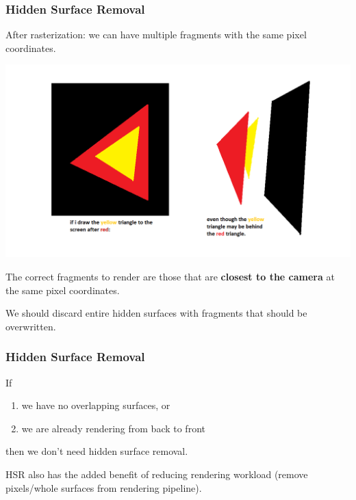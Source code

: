 \documentclass{beamer}
\begin{document}
\begin{frame}
    \frametitle{Hidden Surface Removal}

    After rasterization: we can have multiple fragments with the same pixel coordinates.

    \begin{center}
        \includegraphics[scale=0.25]{q6-hsr.png}
    \end{center}

    The correct fragments to render are those that are \textbf{closest to the camera} 
    at the same pixel coordinates. 
    
    We should discard entire hidden surfaces with fragments that should be overwritten.

\end{frame}

\begin{frame}
    \frametitle{Hidden Surface Removal}

    If
    \begin{enumerate}
        \item we have no overlapping surfaces, or
        \item we are already rendering from back to front
    \end{enumerate}
    then we don't need hidden surface removal.

    \begin{tcolorbox}
        HSR also has the added benefit of reducing rendering workload 
        (remove pixels/whole surfaces from rendering pipeline).
    \end{tcolorbox}

\end{frame}
\end{document}
